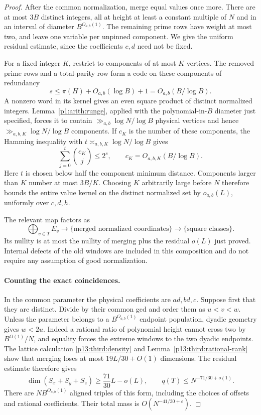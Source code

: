 \begin{proof}
After the common normalization, merge equal values once more.
There are at most $3B$ distinct integers, all at height at least a
constant multiple of $N$ and in an interval of diameter
$B^{O_{a,b}(1)}$.  The remaining prime rows have weight at most two,
and leave one variable per unpinned component.  We give the uniform
residual estimate, since the coefficients $c,d$ need not be fixed.

For a fixed integer $K$, restrict to components of at most $K$ vertices.
The removed prime rows and a total-parity row form a code on these
components of redundancy
\[
 s\leq\pi(H)+O_{a,b}(\log B)+1=O_{a,b}(B/\log B).
\]
A nonzero word in its kernel gives an even square product of distinct
normalized integers.  Lemma~\ref{p1:arith:runge}, applied with the
polynomial-in-$B$ diameter just specified, forces it to contain
$\gg_{a,b}\log N/\log B$ physical vertices and hence
$\gg_{a,b,K}\log N/\log B$ components.
If $c_K$ is the number of these components, the Hamming inequality with
$t\asymp_{a,b,K}\log N/\log B$ gives
\[
 \sum_{j=0}^{t}\binom{c_K}{j}\leq2^s,
 \qquad c_K=O_{a,b,K}(B/\log B).
\]
Here $t$ is chosen below half the component minimum distance.
Components larger than $K$ number at most $3B/K$.
Choosing $K$ arbitrarily large before $N$ therefore bounds the entire
value kernel on the distinct normalized set by $o_{a,b}(L)$,
uniformly over $c,d,h$.

The relevant map factors as
\[
 \bigoplus_{v\in T}E_v
   \longrightarrow\{\text{merged normalized coordinates}\}
   \longrightarrow\{\text{square classes}\}.
\]
Its nullity is at most the nullity of merging plus the residual $o(L)$
just proved.  Internal defects of the old windows are included in this
composition and do not require any assumption of good normalization.

\paragraph{Counting the exact coincidences.}
In the common parameter the physical coefficients are $ad,bd,c$.
Suppose first that they are distinct.  Divide by their common gcd
and order them as $u<v<w$.  Unless the parameter belongs to a
$B^{O_{a,b}(1)}$ endpoint population, dyadic geometry gives $w<2u$.
Indeed a rational ratio of polynomial height cannot cross two by
$B^{O(1)}/N$, and equality forces the extreme windows to the two
dyadic endpoints.
The lattice calculation \eqref{p13:third:density} and
Lemma~\ref{p13:third:rational-rank} show that merging loses at most
$19L/30+O(1)$ dimensions.  The residual estimate therefore gives
\[
 \dim(S_x+S_y+S_z)\geq\frac{71}{30}L-o(L),\qquad
 q(T)\leq N^{-71/30+o(1)}.
\]
There are $NB^{O_{a,b}(1)}$ aligned triples of this form, including the
choices of offsets and rational coefficients.  Their total mass is
$O(N^{-41/30+\varepsilon})$.


\end{proof}
